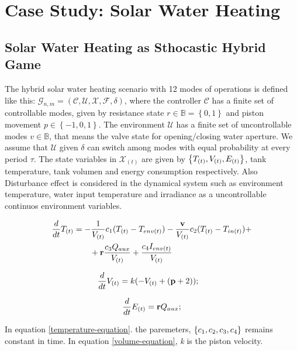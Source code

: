 \documentclass[conference]{IEEEtran}
\begin{document}
\section{Case Study: Solar Water Heating}


\subsection{Solar Water Heating as Sthocastic Hybrid Game}

The hybrid solar water heating scenario with 12 modes of operations is
defined  like this: $\mathcal{G}_{n,m} = (\mathcal{C,U,X,F},\delta)$, 
where the controller $\mathcal{C}$ has a finite set of controllable modes,
given by resistance state ${r \in \mathbb{B} = \left\lbrace 0,1 \right\rbrace }$ 
and piston movement $p \in \left\lbrace-1,0,1\right\rbrace $. 
The environment $\mathcal{U}$ has a finite set of uncontrollable modes
 $v \in \mathbb{B} $, that means the valve state for opening/closing
water aperture. We assume that $\mathcal{U}$ given $\delta$ can switch
among modes with equal probability at every period $\tau$. The state variables
in $\mathcal{X}_{(t)}$ are given by $\left\lbrace T_{(t)},V_{(t)},E_{(t)} \right\rbrace $, 
tank temperature, tank volumen and energy consumption respectively. Also 
Disturbance effect is considered in the dynamical system such as environment
temperature, water input temperature and irradiance as a uncontrollable 
continuos environment variables.


\begin{align}
    \frac{d}{dt}\tcont &=   -\frac{1}{\vcont}  \constone(\tcont-\tenv) - 
    \frac{ \textbf{v} }{\vcont}\consttwo (\tcont-\tin) + \notag\\ &\qquad +
    \textbf{r} \frac{ \constthree \auxheat  }{\vcont}  + 
    \frac{ \constfour \irradiance}{\vcont} 
\label{temperature-equation}
\end{align}

\begin{equation}
    \frac{d}{dt}\vcont = k( - \vcont + (\textbf{p}+2) ); \quad
\label{volume-equation}
\end{equation}

\begin{equation} 
\frac{d}{dt}\energy =  \textbf{r}  \auxheat ;
\label{Energy-equation}
\end{equation}

In equation \ref{temperature-equation}. the paremeters,  $\left\lbrace 
c_1, c_{2}, c_{3}, c_{4} \right\rbrace $ 
remains constant in time. In equation \ref{volume-equation}, 
\emph{k} is the piston velocity.
\end{document}
